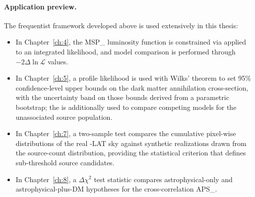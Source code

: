 \paragraph{Application preview.}

The frequentist framework developed above is used extensively in this thesis:
\begin{itemize}
	\item In Chapter~\ref{ch:4}, the \gls{MSP_} luminosity function is constrained via \MLE applied to an integrated likelihood, and model comparison is performed through $-2\Delta\ln\mathcal{L}$ values.
	\item In Chapter~\ref{ch:5}, a profile likelihood \TS is used with Wilks' theorem to set 95\% confidence-level upper bounds on the dark matter annihilation cross-section, with the uncertainty band on those bounds derived from a parametric bootstrap; the \AIC is additionally used to compare competing models for the unassociated source population.
	\item In Chapter~\ref{ch:7}, a two-sample \KS test compares the cumulative pixel-wise \TS distributions of the real \Fermi-LAT sky against synthetic realizations drawn from the source-count distribution, providing the statistical criterion that defines sub-threshold source candidates.
	\item In Chapter~\ref{ch:8}, a $\Delta\chi^2$ test statistic compares astrophysical-only and astrophysical-plus-DM hypotheses for the cross-correlation \gls{APS_}.
\end{itemize}


